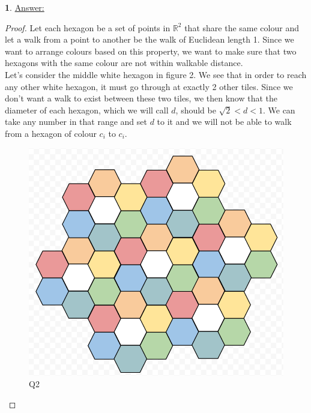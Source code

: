 \documentclass[12pt,a4paper]{article}
\newcommand{\R}{\mathbb{R}}
\theoremstyle{definition}
\newtheorem{problem}{}
\begin{document}
\begin{problem} \underline{Answer:}
\begin{proof}
Let each hexagon be a set of points in $\R^2$ that share the same colour and let a walk from a point to another be the walk of Euclidean length 1. Since we want to arrange colours based on this property, we want to make sure that two hexagons with the same colour are not within walkable distance. \\

Let's consider the middle white hexagon in figure 2. We see that in order to reach any other white hexagon, it must go through at exactly 2 other tiles. Since we don't want a walk to exist between these two tiles, we then know that the diameter of each hexagon, which we will call $d$, should be $\sqrt{2} < d < 1$. We can take any number in that range and set $d$ to it and we will not be able to walk from a hexagon of colour $c_i$ to $c_i$.
\begin{figure}[H]
    \centering
    \includegraphics[scale=0.6]{q2.png}
    \caption{Q2}
    \label{fig:my_label}
\end{figure}
\end{proof}
\end{problem}
\end{document}
